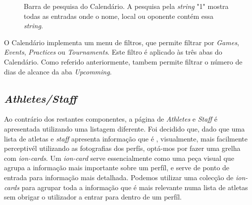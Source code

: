 \begin{figure}[h]
	\begin{center}
	\end{center}
	\caption{Barra de pesquisa do Calendário. A pesquisa pela \textit{string} "1" mostra todas as entradas onde o nome, local ou oponente contém essa \textit{string}. }\label{fig:gamessortednameup}
\end{figure}

O Calendário implementa um menu de filtros, que permite filtrar por \textit{Games}, \textit{Events}, \textit{Practices} ou \textit{Tournaments}. Este filtro é aplicado às três abas do Calendário. Como referido anteriormente, tambem permite filtrar o número de dias de alcance da aba \textit{Upcomming}.
\newpage


\subsection{\textit{Athletes/Staff}}\label{subsec423}

Ao contrário dos restantes componentes, a página de \textit{Athletes} e \textit{Staff} é apresentada utilizando uma listagem diferente. Foi decidido que, dado que uma lista de atletas e \textit{staff} apresenta informação que é , visualmente, mais facilmente perceptivél utilizando as fotografias dos perfís, optá-mos por fazer uma grelha com \textit{ion-cards}. Um \textit{ion-card} serve essencialmente como uma peça visual que agrupa a informação mais importante sobre um perfíl, e serve de ponto de entrada para informação mais detalhada. Podemos utilizar uma colecção de \textit{ion-cards} para agrupar toda a informação que é mais relevante numa lista de atletas sem obrigar o utilizador a entrar para dentro de um perfíl.
\newpage

